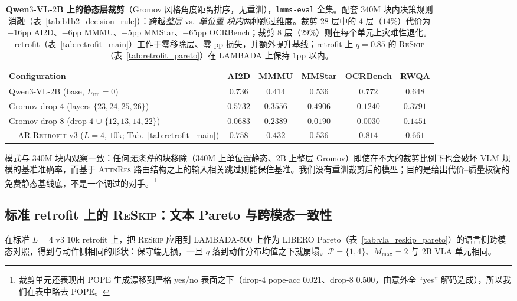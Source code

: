 \documentclass{article}
\newcommand{\attnres}{\textsc{AttnRes}}
\newcommand{\reskip}{\textsc{ReSkip}}
\newcommand{\retrofit}{\textsc{AR-Retrofit}}
\begin{document}
\begin{table}[h]
\caption{\textbf{Qwen$3$-VL-$2$B 上的静态层裁剪}（Gromov 风格角度距离排序，无重训），\texttt{lmms-eval} 全集。配套 $340$M 块内决策规则消融（表~\ref{tab:b1b2_decision_rule}）：跨越\emph{整层} vs.\ \emph{单位置-块内}两种跳过维度。裁剪 $28$ 层中的 $4$ 层（$14\%$）代价为 $-16$pp AI2D、$-6$pp MMMU、$-5$pp MMStar、$-65$pp OCRBench；裁剪 $8$ 层（$29\%$）则在每个单元上灾难性退化。retrofit（表~\ref{tab:retrofit_main}）工作于零移除层、零 pp 损失，并额外提升基线；retrofit 上 $q{=}0.85$ 的 \reskip{}（表~\ref{tab:retrofit_pareto}）在 LAMBADA 上保持 $1$pp 以内。}
\label{tab:gromov_pruning_2b}
\centering\small
\setlength{\tabcolsep}{4pt}
\begin{tabular}{lccccc}
\toprule
Configuration & AI2D & MMMU & MMStar & OCRBench & RWQA \\
\midrule
Qwen3-VL-2B (base, $L_{\text{rm}}{=}0$)            & $0.736$ & $0.414$ & $0.536$ & $0.772$ & $0.648$ \\
Gromov drop-$4$ (layers $\{23,24,25,26\}$)         & $0.5732$ & $0.3556$ & $0.4906$ & $0.1240$ & $0.3791$ \\
Gromov drop-$8$ (drop-$4$ $\cup$ $\{12,13,14,22\}$) & $0.0683$ & $0.2389$ & $0.0190$ & $0.0030$ & $0.1451$ \\
\midrule
$+$ \retrofit{} v3 ($L{=}4$, $10$k; Tab.~\ref{tab:retrofit_main}) & $\mathbf{0.758}$ & $\mathbf{0.432}$ & $\mathbf{0.536}$ & $\mathbf{0.814}$ & $\mathbf{0.661}$ \\
\bottomrule
\end{tabular}
\end{table}

模式与 $340$M 块内观察一致：任何\emph{无条件}的块移除（$340$M 上单位置静态、$2$B 上整层 Gromov）即使在不大的裁剪比例下也会破坏 VLM 规模的基准准确率，而基于 \attnres{} 路由结构之上的输入相关跳过则能保住基准。我们没有重训裁剪后的模型；目的是给出代价--质量权衡的免费静态基线底，不是一个调过的对手。\footnote{裁剪单元还表现出 POPE 生成漂移到严格 yes/no 表面之下（drop-$4$ pope-acc $0.021$、drop-$8$ $0.500$，由意外全 ``yes'' 解码造成），所以我们在表中略去 POPE。}

\subsection{标准 retrofit 上的 \reskip{}：文本 Pareto 与跨模态一致性}
\label{app:retrofit_pareto}
在标准 $L{=}4$ v3 $10$k retrofit 上，把 \reskip{} 应用到 LAMBADA-$500$ 上作为 LIBERO Pareto（表~\ref{tab:vla_reskip_pareto}）的语言侧跨模态对照，得到与动作侧相同的形状：保守端无损，一旦 $q$ 落到动作分布均值之下就崩塌。$\mathcal{P}{=}\{1,4\}$、$M_{\max}{=}2$ 与 $2$B VLA 单元相同。
\end{document}

